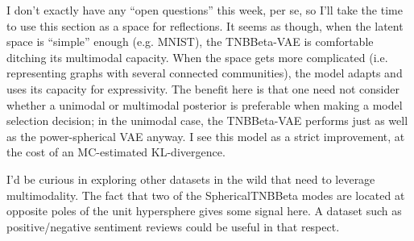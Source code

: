 I don't exactly have any ``open questions'' this week, per se, so I'll take the time to
use this section as a space for reflections. It seems as though, when the latent space is
``simple'' enough (e.g. MNIST), the TNBBeta-VAE is comfortable ditching its multimodal
capacity. When the space gets more complicated (i.e. representing graphs with several
connected communities), the model adapts and uses its capacity for expressivity. The
benefit here is that one need not consider whether a unimodal or multimodal posterior is
preferable when making a model selection decision; in the unimodal case, the TNBBeta-VAE
performs just as well as the power-spherical VAE anyway. I see this model as a strict
improvement, at the cost of an MC-estimated KL-divergence.

I'd be curious in exploring other datasets in the wild that need to leverage multimodality.
The fact that two of the SphericalTNBBeta modes are located at opposite poles of the unit
hypersphere gives some signal here. A dataset such as positive/negative sentiment reviews
could be useful in that respect.
